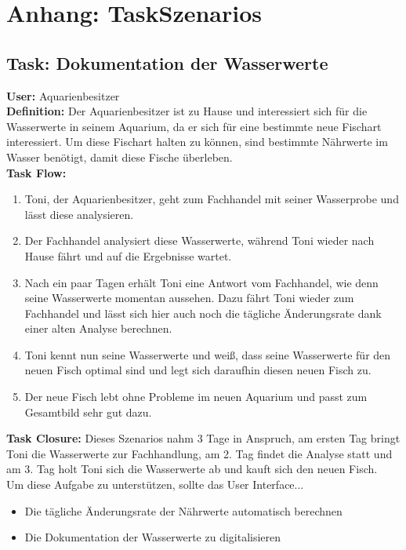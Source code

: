 \section{Anhang: TaskSzenarios}\label{app:taskscenarios}

\subsection{Task: Dokumentation der Wasserwerte}
\textbf{User:} Aquarienbesitzer\\

\textbf{Definition:} Der Aquarienbesitzer ist zu Hause und interessiert sich für die Wasserwerte in seinem Aquarium, da er sich für eine bestimmte neue Fischart interessiert. Um diese Fischart halten zu können, sind bestimmte Nährwerte im Wasser benötigt, damit diese Fische überleben.\\

\textbf{Task Flow:}
\begin{enumerate}
 	\item Toni, der Aquarienbesitzer, geht zum Fachhandel mit seiner Wasserprobe und lässt diese analysieren.
 	\item Der Fachhandel analysiert diese Wasserwerte, während Toni wieder nach Hause fährt und auf die Ergebnisse wartet.
 	\item Nach ein paar Tagen erhält Toni eine Antwort vom Fachhandel, wie denn seine Wasserwerte momentan aussehen. Dazu fährt Toni wieder zum Fachhandel und lässt sich  hier auch noch die tägliche Änderungsrate dank einer alten Analyse berechnen.
 	\item Toni kennt nun seine Wasserwerte und weiß, dass seine Wasserwerte für den neuen Fisch optimal sind und legt sich daraufhin diesen neuen Fisch zu.
	 \item Der neue Fisch lebt ohne Probleme im neuen Aquarium und passt zum Gesamtbild sehr gut dazu.
\end{enumerate}
\textbf{Task Closure:} Dieses Szenarios nahm 3 Tage in Anspruch, am ersten Tag bringt Toni die Wasserwerte zur Fachhandlung, am 2. Tag findet die Analyse statt und am 3. Tag holt Toni sich die Wasserwerte ab und kauft sich den neuen Fisch.\\

Um diese Aufgabe zu unterstützen, sollte das User Interface...
\begin{itemize}
  \item Die tägliche Änderungsrate der Nährwerte automatisch berechnen
  \item Die Dokumentation der Wasserwerte zu digitalisieren
\end{itemize}	


